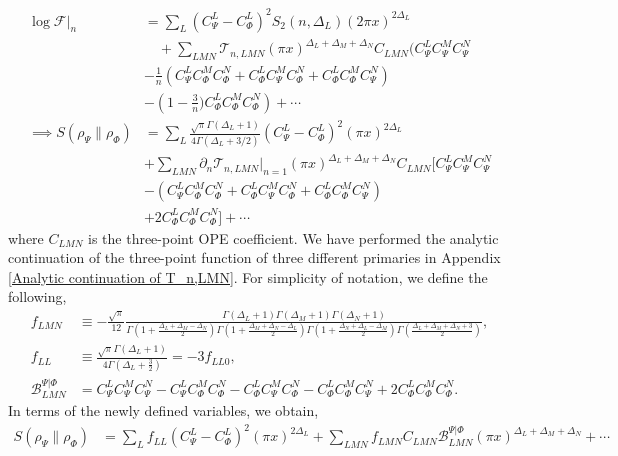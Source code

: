 \documentclass[11pt]{article}
\newcommand{\p}{\partial}
\newcommand{\nn}{\nonumber}
\newcommand{\lb}{\left(}
\newcommand{\rb}{\right)}
\begin{document}
\begin{align}
    \log \mathcal{F}|_n &= \sum_L (C^L_{\Psi}-C^L_{\Phi})^2S_2(n,\Delta_L) (2\pi x)^{2\Delta_L} \nn \\&\quad+  \sum_{LMN}\mathcal{T}_{n,LMN}(\pi x)^{\Delta_L+ \Delta_M + \Delta_N} C_{LMN} \Big( C_{\Psi}^LC_{\Psi}^MC_{\Psi}^N \nn \\&- \frac{1}{n} \lb C_{\Psi}^LC_{\Phi}^MC_{\Phi}^N + C_{\Phi}^LC_{\Psi}^MC_{\Phi}^N+C_{\Phi}^LC_{\Phi}^MC_{\Psi}^N\rb\nn \\
    &
    - \lb1-\frac{3}{n}\Big) C_{\Phi}^LC_{\Phi}^MC_{\Phi}^N \rb+ \cdots \\
    \implies S(\rho_\Psi\|\rho_\Phi) &= \sum_L\frac{\sqrt{\pi}\Gamma(\Delta_L+1)}{4\Gamma(\Delta_L+3/2)}(C^L_{\Psi}-C^L_{\Phi})^2 (\pi x)^{2\Delta_L} \nn \\&+ \sum_{LMN}\p_n \mathcal{T}_{n,LMN}|_{n=1}(\pi x)^{\Delta_L+ \Delta_M + \Delta_N} C_{LMN} \Big[ C_{\Psi}^LC_{\Psi}^MC_{\Psi}^N \nn \\&- \lb C_{\Psi}^LC_{\Phi}^MC_{\Phi}^N + C_{\Phi}^LC_{\Psi}^MC_{\Phi}^N+C_{\Phi}^LC_{\Phi}^MC_{\Psi}^N\rb\nn \\
    &
    +2 C_{\Phi}^LC_{\Phi}^MC_{\Phi}^N \Big] + \cdots
\end{align}
where $C_{LMN}$ is the three-point OPE coefficient. We have performed the analytic continuation of the three-point function of three different primaries in Appendix \ref{Analytic continuation of T_n,LMN}. For simplicity of notation, we define the following,
\begin{align}
    f_{LMN}
&\equiv
-\frac{\sqrt{\pi}}{12}
\frac{
\Gamma(\Delta_L+1)
\Gamma(\Delta_M+1)
\Gamma(\Delta_N+1)
}{
\Gamma\lb1+\frac{\Delta_L+\Delta_M-\Delta_N}{2}\rb
\Gamma\lb1+\frac{\Delta_M+\Delta_N-\Delta_L}{2}\rb
\Gamma\lb1+\frac{\Delta_N+\Delta_L-\Delta_M}{2}\rb
\Gamma\lb\frac{\Delta_L+\Delta_M+\Delta_N+3}{2}\rb
},\\
    f_{LL}
    &\equiv
    \frac{\sqrt{\pi}\Gamma(\Delta_L+1)}
    {4\Gamma\lb\Delta_L+\frac32\rb}=-3f_{LL0},\\
\mathcal B_{LMN}^{\Psi|\Phi}
&={}
C_\Psi^LC_\Psi^MC_\Psi^N
-C_\Psi^LC_\Phi^MC_\Phi^N
-C_\Phi^LC_\Psi^MC_\Phi^N
-
C_\Phi^LC_\Phi^MC_\Psi^N
+2C_\Phi^LC_\Phi^MC_\Phi^N .
\end{align}
In terms of the newly defined variables, we obtain,
\begin{align}
    S(\rho_\Psi\|\rho_\Phi)&=\sum_Lf_{LL}(C_{\Psi }^L-C_{\Phi}^L)^2(\pi x)^{2\Delta_L} + \sum_{LMN}f_{LMN}C_{LMN}\mathcal B_{LMN}^{\Psi|\Phi}(\pi x)^{\Delta_L+\Delta_M+\Delta_N} + \cdots
\end{align}
\end{document}
